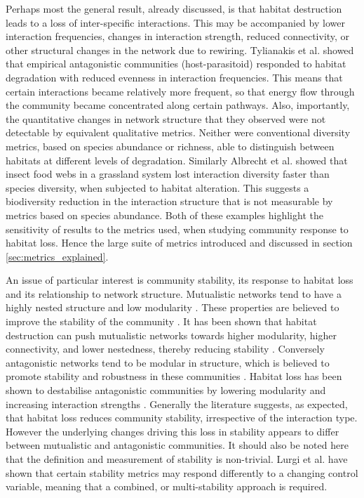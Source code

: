Perhaps most the general result, already discussed, is that habitat destruction leads to a loss of inter-specific interactions. This may be accompanied by lower interaction frequencies, changes in interaction strength, reduced connectivity, or other structural changes in the network due to rewiring. Tylianakis et al. \cite{tylianakis2007habitat} showed that empirical antagonistic communities (host-parasitoid) responded to habitat degradation with reduced evenness in interaction frequencies. This means that certain interactions became relatively more frequent, so that energy flow through the community became concentrated along certain pathways. Also, importantly, the quantitative changes in network structure that they observed were not detectable by equivalent qualitative metrics. Neither were conventional diversity metrics, based on species abundance or richness, able to distinguish between habitats at different levels of degradation. Similarly Albrecht et al. \cite{albrecht2007interaction} showed that insect food webs in a grassland system lost interaction diversity faster than species diversity, when subjected to habitat alteration. This suggests a biodiversity reduction in the interaction structure that is not measurable by metrics based on species abundance. Both of these examples highlight the sensitivity of results to the metrics used, when studying community response to habitat loss. Hence the large suite of metrics introduced and discussed in section \ref{sec:metrics_explained}.

An issue of particular interest is community stability, its response to habitat loss and its relationship to network structure. Mutualistic networks tend to have a highly nested structure and low modularity \cite{bascompte2007plant}. These properties are believed to improve the stability of the community \cite{thebault2010stability}. It has been shown that habitat destruction can push mutualistic networks towards higher modularity, higher connectivity, and lower nestedness, thereby reducing stability \cite{spiesman2013habitat, hagen2012biodiversity}. Conversely antagonistic networks tend to be modular in structure, which is believed to promote stability and robustness in these communities \cite{thebault2010stability}. Habitat loss has been shown to destabilise antagonistic communities by lowering modularity and increasing interaction strengths \cite{hagen2012biodiversity}. Generally the literature suggests, as expected, that habitat loss reduces community stability, irrespective of the interaction type. However the underlying changes driving this loss in stability appears to differ between mutualistic and antagonistic communities. It should also be noted here that the definition and measurement of stability is non-trivial. Lurgi et al. \cite{lurgi2015effects} have shown that certain stability metrics may respond differently to a changing control variable, meaning that a combined, or multi-stability approach is required.


